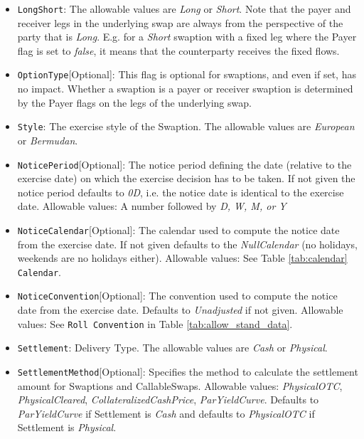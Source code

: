 \begin{itemize}
\item \lstinline!LongShort!: The allowable values are \emph{Long} or \emph{Short}. Note that the payer and receiver legs in the underlying swap are always from the perspective of the party that is \emph{Long}. E.g. for a \emph{Short} swaption with a fixed leg where the Payer flag is set to \emph{false}, it means that the counterparty receives the fixed flows.  

\item \lstinline!OptionType![Optional]: This flag is optional for swaptions, and even if set, has no impact. Whether a swaption is a payer or receiver swaption is determined by the Payer flags on the legs of the underlying swap.

\item  \lstinline!Style!: The exercise style of the Swaption. The allowable values are \emph{European} or \emph{Bermudan}.

\item \lstinline!NoticePeriod![Optional]: The notice period defining the date (relative to the exercise date) on which the exercise
  decision has to be taken. If not given the notice period defaults to \emph{0D}, i.e. the notice date is identical to the
  exercise date. Allowable values: A number followed by \emph{D, W, M, or Y}

\item \lstinline!NoticeCalendar![Optional]: The calendar used to compute the notice date from the exercise date. If not given
  defaults to the \emph{NullCalendar} (no holidays, weekends are no holidays either). Allowable values: See Table \ref{tab:calendar} \lstinline!Calendar!.

\item \lstinline!NoticeConvention![Optional]: The convention used to compute the notice date from the exercise date. Defaults to
  \emph{Unadjusted} if not given. Allowable values: See \lstinline!Roll Convention! in Table \ref{tab:allow_stand_data}.

\item  \lstinline!Settlement!: Delivery Type. The allowable values are \emph{Cash} or \emph{Physical}.

\item \lstinline!SettlementMethod![Optional]: Specifies the method to calculate the settlement amount for Swaptions and CallableSwaps. Allowable values: \emph{PhysicalOTC}, \emph{PhysicalCleared}, \emph{CollateralizedCashPrice}, \emph{ParYieldCurve}. Defaults to \emph{ParYieldCurve} if Settlement is \emph{Cash} and defaults to \emph{PhysicalOTC} if Settlement is \emph{Physical}.


\end{itemize}
